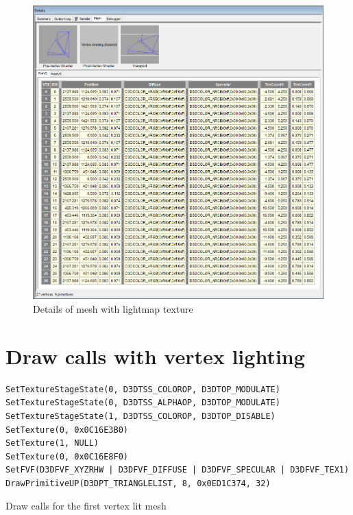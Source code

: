 \begin{appendix}
\begin{figure}[htbp]
	\centering
		\includegraphics[width=1.00\textwidth]{img/PIX/PIX_lightbaking_details.png}
	\caption[Details of mesh with lightmap texture]{Details of mesh with lightmap texture}
	\label{fig:PIXLightmapMeshDetails}
\end{figure}

\clearpage
{}
\section{Draw calls with vertex lighting}

\begin{listing}[htbp]
\begin{verbatim}
SetTextureStageState(0, D3DTSS_COLOROP, D3DTOP_MODULATE) 
SetTextureStageState(0, D3DTSS_ALPHAOP, D3DTOP_MODULATE)	
SetTextureStageState(1, D3DTSS_COLOROP, D3DTOP_DISABLE)				
SetTexture(0, 0x0C16E3B0)	
SetTexture(1, NULL)			
SetTexture(0, 0x0C16E8F0)	
SetFVF(D3DFVF_XYZRHW | D3DFVF_DIFFUSE | D3DFVF_SPECULAR | D3DFVF_TEX1)		
DrawPrimitiveUP(D3DPT_TRIANGLELIST, 8, 0x0ED1C374, 32)	
\end{verbatim}
\caption[Draw calls for the first vertex lit mesh]{Draw calls for the first vertex lit mesh}
\label{lst:DrawCallsForTheFirstVertexLitMesh}
\end{listing}


\end{appendix}
